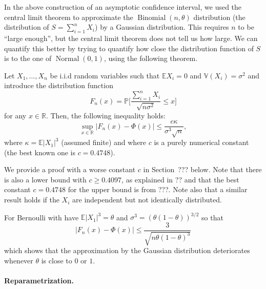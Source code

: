 \documentclass[
	fontsize=11pt, %
	twoside=false, %
	numbers=noenddot, %
]{kaobook}
\DeclareMathOperator{\nor}{Normal}
\DeclareMathOperator{\bin}{Binomial}
\renewcommand{\P}{\mathbb P}
\newcommand{\E}{\mathbb E}
\newcommand{\R}{\mathbb R}
\newcommand{\var}{\mathbb V}
\begin{document}
In the above construction of an asymptotic confidence interval, we used the central limit theorem to approximate the $\bin(n, \theta)$ distribution (the distribution of $S = \sum_{i=1}^n X_i$) by a Gaussian distribution.
This requires $n$ to be ``large enough'', but the central limit theorem does not tell us how large.
We can quantify this better by trying to quantify how close the distribution function of $S$ is to the one of $\nor(0, 1)$, using the following theorem.
\begin{theorem}
	Let $X_1, \ldots, X_n$ be i.i.d random variables such that $\E X_i = 0$ and $\var(X_i) = \sigma^2$ and introduce the distribution function%
	\begin{equation*}
		F_n(x) = \P \bigg[ \frac{\sum_{i=1}^n X_i}{\sqrt{n \sigma^2}} \leq x \bigg]
	\end{equation*}
	for any $x \in \R$. Then, the following inequality holds:
	\begin{equation*}
		\sup_{x \in \R} |F_n(x) - \Phi(x)| \leq \frac{c \kappa}{\sigma^3 \sqrt n},
	\end{equation*}
	where $\kappa = \E |X_1|^3$ (assumed finite) and where $c$ is a purely numerical constant (the best known one is $c = 0.4748$).
\end{theorem}
We provide a proof with a worse constant $c$ in Section~??? below.
Note that there is also a lower bound with $c \geq 0.4097$, as explained in ?? and that the best constant $c = 0.4748$ for the upper bound is from ???.
Note also that a similar result holds if the $X_i$ are independent but not identically distributed.

For Bernoulli with have $\E|X_1|^3 = \theta$ and $\sigma^3 = (\theta(1 - \theta))^{3/2}$ so that 
\begin{equation*}
	|F_n(x) - \Phi(x)| \leq \frac{3}{\sqrt{n \theta (1 - \theta)^3}}
\end{equation*}
which shows that the approximation by the Gaussian distribution deteriorates whenever $\theta$ is close to $0$ or $1$.

\paragraph{Reparametrization.} %
\end{document}

